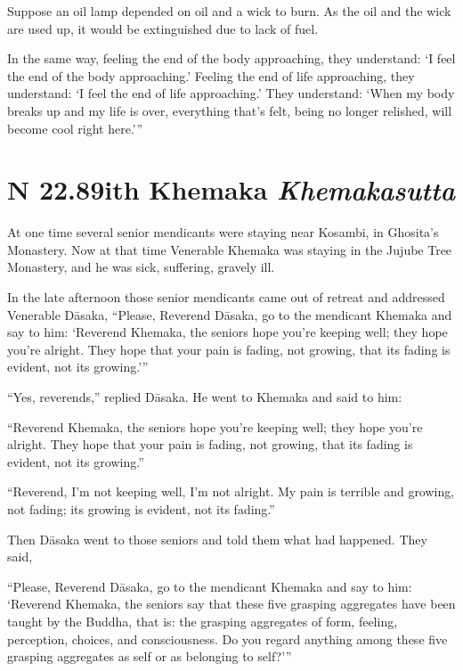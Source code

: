 \documentclass[12pt,openany]{book}%
\newcommand*{\suttatitleacronym}[1]{\smaller[2]{#1}\vspace*{.3em}}
\newcommand*{\suttatitletranslation}[1]{\linebreak{#1}}
\newcommand*{\suttatitleroot}[1]{\linebreak\smaller[2]\itshape{#1}}
\newcommand*{\tocacronym}[1]{\hspace*{-3.3em}{#1}\quad}
\newcommand*{\toctranslation}[1]{#1}
\newcommand*{\tocroot}[1]{(\textit{#1})}
\begin{document}
Suppose an oil lamp depended on oil and a wick to burn. As the oil and the wick are used up, it would be extinguished due to lack of fuel. 

In the same way, feeling the end of the body approaching, they understand: ‘I feel the end of the body approaching.’ Feeling the end of life approaching, they understand: ‘I feel the end of life approaching.’ They understand: ‘When my body breaks up and my life is over, everything that’s felt, being no longer relished, will become cool right here.’” 

%
\section*{{\suttatitleacronym SN 22.89}{\suttatitletranslation With Khemaka }{\suttatitleroot Khemakasutta}}
\addcontentsline{toc}{section}{\tocacronym{SN 22.89} \toctranslation{With Khemaka } \tocroot{Khemakasutta}}

At one time several senior mendicants were staying near Kosambi, in Ghosita’s Monastery. Now at that time Venerable Khemaka was staying in the Jujube Tree Monastery, and he was sick, suffering, gravely ill. 

In the late afternoon those senior mendicants came out of retreat and addressed Venerable \textsanskrit{Dāsaka}, “Please, Reverend \textsanskrit{Dāsaka}, go to the mendicant Khemaka and say to him: ‘Reverend Khemaka, the seniors hope you’re keeping well; they hope you’re alright. They hope that your pain is fading, not growing, that its fading is evident, not its growing.’” 

“Yes, reverends,” replied \textsanskrit{Dāsaka}. He went to Khemaka and said to him: 

“Reverend Khemaka, the seniors hope you’re keeping well; they hope you’re alright. They hope that your pain is fading, not growing, that its fading is evident, not its growing.” 

“Reverend, I’m not keeping well, I’m not alright. My pain is terrible and growing, not fading; its growing is evident, not its fading.” 

Then \textsanskrit{Dāsaka} went to those seniors and told them what had happened. They said, 

“Please, Reverend \textsanskrit{Dāsaka}, go to the mendicant Khemaka and say to him: ‘Reverend Khemaka, the seniors say that these five grasping aggregates have been taught by the Buddha, that is: the grasping aggregates of form, feeling, perception, choices, and consciousness. Do you regard anything among these five grasping aggregates as self or as belonging to self?’” 
\end{document}
